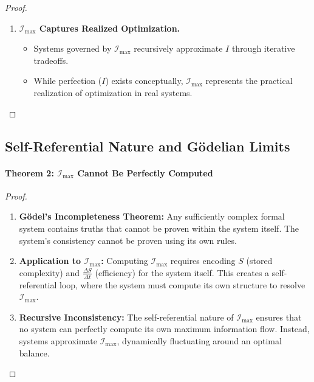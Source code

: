 \documentclass[12pt]{article}
\begin{document}
\begin{proof}
\begin{enumerate}
    \item \textbf{\(\mathcal{I}_{\text{max}}\) Captures Realized Optimization.}
    \begin{itemize}
        \item Systems governed by \(\mathcal{I}_{\text{max}}\) recursively approximate \(I\) through iterative tradeoffs.
        \item While perfection (\(I\)) exists conceptually, \(\mathcal{I}_{\text{max}}\) represents the practical realization of optimization in real systems.
    \end{itemize}
\end{enumerate}
\end{proof}


\subsection{Self-Referential Nature and Gödelian Limits}

\paragraph{Theorem 2: \(\mathcal{I}_{\text{max}}\) Cannot Be Perfectly Computed}

\begin{proof}
\begin{enumerate}
    \item \textbf{Gödel's Incompleteness Theorem:}
    Any sufficiently complex formal system contains truths that cannot be proven within the system itself. The system's consistency cannot be proven using its own rules.
    
    \item \textbf{Application to \(\mathcal{I}_{\text{max}}\):}
    Computing \(\mathcal{I}_{\text{max}}\) requires encoding \(S\) (stored complexity) and \(\frac{\Delta S}{\Delta t}\) (efficiency) for the system itself. This creates a self-referential loop, where the system must compute its own structure to resolve \(\mathcal{I}_{\text{max}}\).

    \item \textbf{Recursive Inconsistency:}
    The self-referential nature of \(\mathcal{I}_{\text{max}}\) ensures that no system can perfectly compute its own maximum information flow. Instead, systems approximate \(\mathcal{I}_{\text{max}}\), dynamically fluctuating around an optimal balance.
\end{enumerate}
\end{proof}
\end{document}
